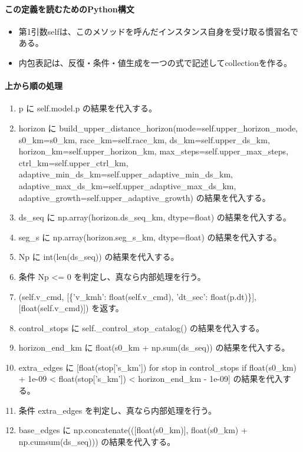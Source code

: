 \documentclass[a4paper,11pt]{article}
\begin{document}
            \paragraph{この定義を読むためのPython構文}
            \begin{itemize}[leftmargin=1.6em]
            \item 第1引数selfは、このメソッドを呼んだインスタンス自身を受け取る慣習名である。
\item 内包表記は、反復・条件・値生成を一つの式で記述してcollectionを作る。
            \end{itemize}
            \paragraph{上から順の処理}
            \begin{enumerate}[leftmargin=1.8em]
            \item p に self.model.p の結果を代入する。
\item horizon に build\_upper\_distance\_horizon(mode=self.upper\_horizon\_mode, s0\_km=s0\_km, race\_km=self.race\_km, ds\_km=self.upper\_ds\_km, horizon\_km=self.upper\_horizon\_km, max\_steps=self.upper\_max\_steps, ctrl\_km=self.upper\_ctrl\_km, adaptive\_min\_ds\_km=self.upper\_adaptive\_min\_ds\_km, adaptive\_max\_ds\_km=self.upper\_adaptive\_max\_ds\_km, adaptive\_growth=self.upper\_adaptive\_growth) の結果を代入する。
\item ds\_seq に np.array(horizon.ds\_seq\_km, dtype=float) の結果を代入する。
\item seg\_s に np.array(horizon.seg\_s\_km, dtype=float) の結果を代入する。
\item Np に int(len(ds\_seq)) の結果を代入する。
\item 条件 Np <= 0 を判定し、真なら内部処理を行う。
\item   (self.v\_cmd, [\{'v\_kmh': float(self.v\_cmd), 'dt\_sec': float(p.dt)\}], [float(self.v\_cmd)]) を返す。
\item control\_stops に self.\_control\_stop\_catalog() の結果を代入する。
\item horizon\_end\_km に float(s0\_km + np.sum(ds\_seq)) の結果を代入する。
\item extra\_edges に [float(stop['s\_km']) for stop in control\_stops if float(s0\_km) + 1e-09 < float(stop['s\_km']) < horizon\_end\_km - 1e-09] の結果を代入する。
\item 条件 extra\_edges を判定し、真なら内部処理を行う。
\item   base\_edges に np.concatenate(([float(s0\_km)], float(s0\_km) + np.cumsum(ds\_seq))) の結果を代入する。

\end{enumerate}
\end{document}
